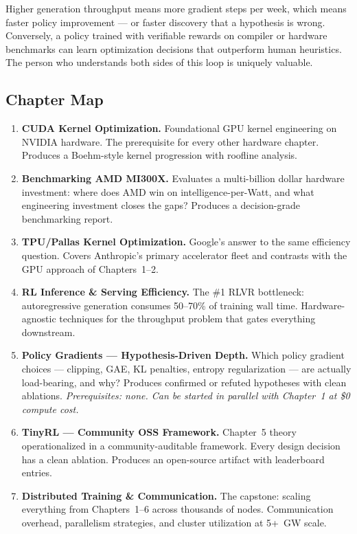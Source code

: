 \noindent Higher generation throughput means more gradient steps per week, which means faster policy improvement --- or faster discovery that a hypothesis is wrong. Conversely, a policy trained with verifiable rewards on compiler or hardware benchmarks can learn optimization decisions that outperform human heuristics. The person who understands both sides of this loop is uniquely valuable.


\subsection{Chapter Map}

\begin{enumerate}
  \item \textbf{CUDA Kernel Optimization.} Foundational GPU kernel engineering on NVIDIA hardware. The prerequisite for every other hardware chapter. Produces a Boehm-style kernel progression with roofline analysis.

  \item \textbf{Benchmarking AMD MI300X.} Evaluates a multi-billion dollar hardware investment: where does AMD win on intelligence-per-Watt, and what engineering investment closes the gaps? Produces a decision-grade benchmarking report.

  \item \textbf{TPU/Pallas Kernel Optimization.} Google's answer to the same efficiency question. Covers Anthropic's primary accelerator fleet and contrasts with the GPU approach of Chapters~1--2.

  \item \textbf{RL Inference \& Serving Efficiency.} The \#1 RLVR bottleneck: autoregressive generation consumes 50--70\% of training wall time. Hardware-agnostic techniques for the throughput problem that gates everything downstream.

  \item \textbf{Policy Gradients --- Hypothesis-Driven Depth.} Which policy gradient choices --- clipping, GAE, KL penalties, entropy regularization --- are actually load-bearing, and why? Produces confirmed or refuted hypotheses with clean ablations. \textit{Prerequisites: none. Can be started in parallel with Chapter~1 at \$0 compute cost.}

  \item \textbf{TinyRL --- Community OSS Framework.} Chapter~5 theory operationalized in a community-auditable framework. Every design decision has a clean ablation. Produces an open-source artifact with leaderboard entries.

  \item \textbf{Distributed Training \& Communication.} The capstone: scaling everything from Chapters~1--6 across thousands of nodes. Communication overhead, parallelism strategies, and cluster utilization at 5+~GW scale.
\end{enumerate}

